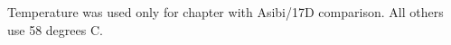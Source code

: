 \documentclass{report}
\begin{document}
\begin{table}
	\caption{Nonsynonymous variants in the Asibi Genome.}
	\begin{ThreePartTable}
	
		\begin{tablenotes}
			\item[a]Temperature was used only for chapter with Asibi/17D comparison. All others use 58 degrees C.
		\end{tablenotes}
	\end{ThreePartTable}
\end{table}
\end{document}
